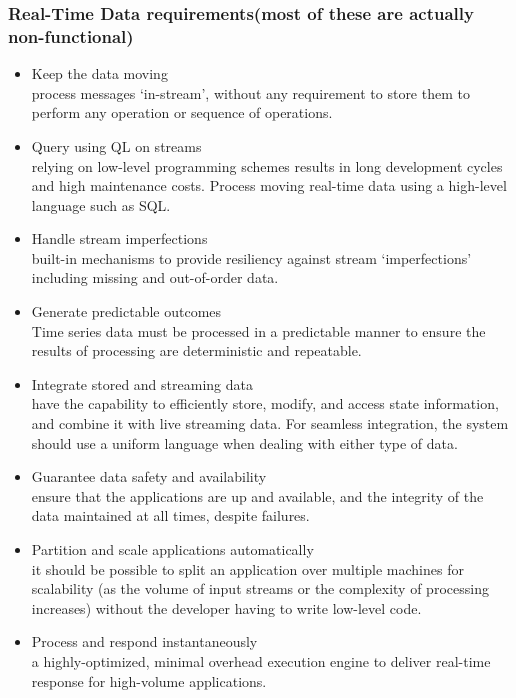 \subsubsection{Real-Time Data requirements(most of these are actually non-functional)}
\begin{itemize}
	\item{Keep the data moving\\process messages ‘in-stream’, without any requirement to store them to perform any operation or sequence of operations.}
	\item{Query using QL on streams\\relying on low-level programming schemes results in long development cycles and high maintenance costs. Process moving real-time data using a high-level language such as SQL.}
	\item{Handle stream imperfections\\ built-in mechanisms to provide resiliency against stream ‘imperfections’ including missing and out-of-order data.}
	\item{Generate predictable outcomes\\Time series data must be processed in a predictable manner to ensure the results of processing are deterministic and repeatable.}
	\item{Integrate stored and streaming data\\have the capability to efficiently store, modify, and access state information, and combine it with live streaming data. For seamless integration, the system should use a uniform language when dealing with either type of data.}
	\item{Guarantee data safety and availability\\ ensure that the applications are up and available, and the integrity of the data maintained at all times, despite failures.}
	\item{Partition and scale applications automatically\\ it should be possible to split an application over multiple machines for scalability (as the volume of input streams or the complexity of processing increases) without the developer having to write low-level code.}
	\item{Process and respond instantaneously\\a highly-optimized, minimal overhead execution engine to deliver real-time response for high-volume applications.}
\end{itemize}